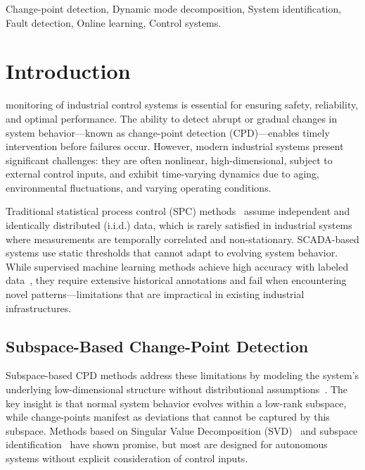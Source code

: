 \documentclass[conference]{IEEEtran}
\begin{document}
\begin{IEEEkeywords}
    Change-point detection, Dynamic mode decomposition, System identification, Fault detection, Online learning, Control systems.
\end{IEEEkeywords}

\section{Introduction}\label{sec:introduction}

 monitoring of industrial control systems is essential for ensuring safety, reliability, and optimal performance. The ability to detect abrupt or gradual changes in system behavior—known as change-point detection (CPD)—enables timely intervention before failures occur. However, modern industrial systems present significant challenges: they are often nonlinear, high-dimensional, subject to external control inputs, and exhibit time-varying dynamics due to aging, environmental fluctuations, and varying operating conditions.

Traditional statistical process control (SPC) methods~\cite{JoeQin2003} assume independent and identically distributed (i.i.d.) data, which is rarely satisfied in industrial systems where measurements are temporally correlated and non-stationary. SCADA-based systems use static thresholds that cannot adapt to evolving system behavior. While supervised machine learning methods achieve high accuracy with labeled data~\cite{Korycki2021}, they require extensive historical annotations and fail when encountering novel patterns—limitations that are impractical in existing industrial infrastructures.

\subsection{Subspace-Based Change-Point Detection}

Subspace-based CPD methods address these limitations by modeling the system's underlying low-dimensional structure without distributional assumptions~\cite{Kawahara2007, Dohler2013}. The key insight is that normal system behavior evolves within a low-rank subspace, while change-points manifest as deviations that cannot be captured by this subspace. Methods based on Singular Value Decomposition (SVD)~\cite{Moskvina2003} and subspace identification~\cite{Hosur2019} have shown promise, but most are designed for autonomous systems without explicit consideration of control inputs.
\end{document}

